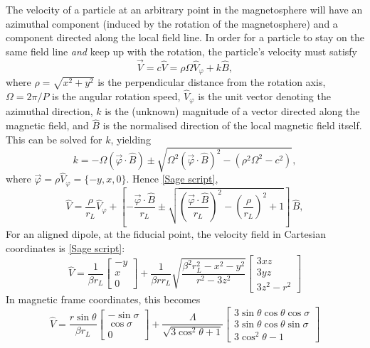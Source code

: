 \documentclass{book}
\newcommand{\phase}{\varphi}
\newcommand{\linktosage}[1]{\hyperref[#1]{[Sage script]}}
\begin{document}
The velocity of a particle at an arbitrary point in the magnetosphere will have an azimuthal component (induced by the rotation of the magnetosphere) and a component directed along the local field line.
In order for a particle to stay on the same field line \emph{and} keep up with the rotation, the particle's velocity must satisfy
\begin{equation}
    \vec{V} = c\hat{V} = \rho\Omega\hat{V}_\phase + k\hat{B},
\end{equation}
where $\rho = \sqrt{x^2 + y^2}$ is the perpendicular distance from the rotation axis, $\Omega = 2\pi/P$ is the angular rotation speed, $\hat{V}_\phase$ is the unit vector denoting the azimuthal direction, $k$ is the (unknown) magnitude of a vector directed along the magnetic field, and $\hat{B}$ is the normalised direction of the local magnetic field itself.
This can be solved for $k$, yielding
\begin{equation}
    k = -\Omega(\vec{\phase}\cdot\hat{B}) \pm \sqrt{\Omega^2(\vec{\phase}\cdot\hat{B})^2 - (\rho^2\Omega^2-c^2)},
\end{equation}
where $\vec{\phase} = \rho\hat{V}_\phase = \{-y,x,0\}$. Hence \linktosage{sage:Vdip},
\begin{equation}
    \hat{V} = \frac{\rho}{r_L}\hat{V}_\phase + \left[-\frac{\vec{\phase}\cdot\hat{B}}{r_L} \pm
              \sqrt{\left(\frac{\vec{\phase}\cdot\hat{B}}{r_L}\right)^2 - \left(\frac{\rho}{r_L}\right)^2 + 1}\right]\,\hat{B},
\end{equation}
For an aligned dipole, at the fiducial point, the velocity field in Cartesian coordinates is \linktosage{sage:V_aligned}:
\begin{equation}
    \hat{V} = \frac{1}{\beta r_L}\begin{bmatrix} -y \\ x \\ 0 \end{bmatrix} +
        \frac{1}{\beta rr_L}\sqrt{\frac{\beta^2r_L^2 - x^2 - y^2}{r^2-3z^2}} \begin{bmatrix} 3xz \\ 3yz \\ 3z^2-r^2 \end{bmatrix}
\end{equation}
In magnetic frame coordinates, this becomes
\begin{equation}
    \hat{V} = \frac{r\sin\theta}{\beta r_L}\begin{bmatrix} -\sin\sigma \\ \cos\sigma \\ 0 \end{bmatrix} +
        \frac{\Lambda}{\sqrt{3\cos^2\theta + 1}}
        \begin{bmatrix} 3\sin\theta\cos\theta\cos\sigma \\ 3\sin\theta\cos\theta\sin\sigma \\ 3\cos^2\theta-1 \end{bmatrix}
\end{equation}
\end{document}
